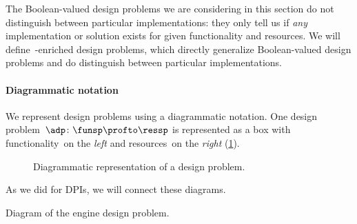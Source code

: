 \begin{solution}
    \missingsolution
\end{solution}

The Boolean-valued design problems we are considering in this section do not distinguish between particular implementations: they only tell us if \emph{any} implementation or solution exists for given functionality and resources.
We will define~\Set-enriched design problems, which directly generalize Boolean-valued design problems and do distinguish between particular implementations.


\paragraph{Diagrammatic notation}
We represent design problems using a diagrammatic notation.
One design problem~$\adp \colon \funsp \profto \ressp$ is represented as a box with functionality~\funsp on the \emph{left} and resources~\ressp on the \emph{right} (\cref{fig:diagrammaticdp}).
\begin{figure}[h!]
    \centering
    \caption{Diagrammatic representation of a design problem. }
    \label{fig:diagrammaticdp}
\end{figure}
As we did for DPIs, we will connect these diagrams.

\begin{marginfigure}
    \centering
    \caption{Diagram of the engine design problem.}
    \label{fig:enginedp}
\end{marginfigure}

